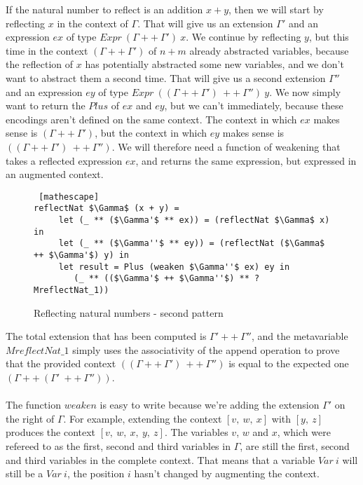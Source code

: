 If the natural number to reflect is an addition $x+y$, then we will start by reflecting $x$ in the context of $\Gamma$. That will give us an extension $\Gamma'$ and an expression $ex$ of type $Expr\ (\Gamma ++\ \Gamma')\ x$. We continue by reflecting $y$, but this time in the context $(\Gamma ++\ \Gamma')$ of $n+m$ already abstracted variables, because the reflection of $x$ has potentially abstracted some new variables, and we don't want to abstract them a second time. That will give us a second extension $\Gamma''$ and an expression $ey$ of type $Expr\ ((\Gamma ++\ \Gamma')\ ++\ \Gamma'')\ y$. We now simply want to return the $Plus$ of $ex$ and $ey$, but we can't immediately, because these encodings aren't defined on the same context. The context in which $ex$ makes sense is $(\Gamma ++\ \Gamma')$, but the context in which $ey$ makes sense is $((\Gamma ++\ \Gamma')\ ++\ \Gamma'')$. We will therefore need a function of weakening that takes a reflected expression $ex$, and returns the same expression, but expressed in an augmented context.

 \begin{figure}[H]
\figrule
\begin{center}
\begin{lstlisting} [mathescape]
reflectNat $\Gamma$ (x + y) =
     let (_ ** ($\Gamma'$ ** ex)) = (reflectNat $\Gamma$ x) in
     let (_ ** ($\Gamma''$ ** ey)) = (reflectNat ($\Gamma$ ++ $\Gamma'$) y) in
     let result = Plus (weaken $\Gamma''$ ex) ey in 
        (_ ** (($\Gamma'$ ++ $\Gamma''$) ** ?MreflectNat_1))
\end{lstlisting}
\end{center}
\caption{Reflecting natural numbers - second pattern}
\figrule
\end{figure}

The total extension that has been computed is $\Gamma' ++\ \Gamma''$, and the metavariable $MreflectNat\_1$ simply uses the associativity of the append operation to prove that the provided context $((\Gamma ++\ \Gamma')\ ++\ \Gamma'')$ is equal to the expected one $(\Gamma ++\ (\Gamma'\ ++\ \Gamma''))$. \\
\\
The function $weaken$ is easy to write because we're adding the extension $\Gamma'$ on the right of $\Gamma$. For example, extending the context $[v,\ w,\ x]$ with $[y,\ z]$ produces the context $[v,\ w,\ x,\ y,\ z]$. The variables $v$, $w$ and $x$, which were refereed to as the first, second and third variables in $\Gamma$, are still the first, second and third variables in the complete context. That means that a variable $Var\ i$ will still be a $Var\ i$, the position $i$ hasn't changed by augmenting the context.

